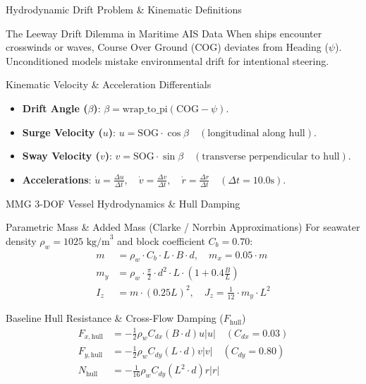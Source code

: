 \documentclass[t]{beamer}
\begin{document}
\begin{frame}{Hydrodynamic Drift Problem \& Kinematic Definitions}
    \begin{block}{The Leeway Drift Dilemma in Maritime AIS Data}
        When ships encounter crosswinds or waves, Course Over Ground ($\mathrm{COG}$) deviates from Heading ($\psi$). Unconditioned models mistake environmental drift for intentional steering.
    \end{block}

    \begin{block}{Kinematic Velocity \& Acceleration Differentials}
        \begin{itemize}
            \item \textbf{Drift Angle ($\beta$)}: $\beta = \mathrm{wrap\_to\_pi}(\mathrm{COG} - \psi)$.
            \item \textbf{Surge Velocity ($u$)}: $u = \mathrm{SOG} \cdot \cos\beta \quad (\text{longitudinal along hull})$.
            \item \textbf{Sway Velocity ($v$)}: $v = \mathrm{SOG} \cdot \sin\beta \quad (\text{transverse perpendicular to hull})$.
            \item \textbf{Accelerations}: $\dot{u} = \frac{\Delta u}{\Delta t}, \quad \dot{v} = \frac{\Delta v}{\Delta t}, \quad \dot{r} = \frac{\Delta r}{\Delta t} \quad (\Delta t = 10.0\text{s})$.
        \end{itemize}
    \end{block}
\end{frame}

\begin{frame}{MMG 3-DOF Vessel Hydrodynamics \& Hull Damping}
    \begin{block}{Parametric Mass \& Added Mass (Clarke / Norrbin Approximations)}
        For seawater density $\rho_w = 1025\text{ kg/m}^3$ and block coefficient $C_b = 0.70$:
        $$\begin{aligned}
        m &= \rho_w \cdot C_b \cdot L \cdot B \cdot d, \quad m_x = 0.05 \cdot m \\
        m_y &= \rho_w \cdot \frac{\pi}{2} \cdot d^2 \cdot L \cdot \left(1 + 0.4 \frac{B}{L}\right) \\
        I_z &= m \cdot (0.25 L)^2, \quad J_z = \frac{1}{12} \cdot m_y \cdot L^2
        \end{aligned}$$
    \end{block}

    \begin{block}{Baseline Hull Resistance \& Cross-Flow Damping ($F_{\mathrm{hull}}$)}
        $$\begin{aligned}
        F_{x,\mathrm{hull}} &= -\frac{1}{2} \rho_w C_{dx} (B \cdot d) u |u| \quad (C_{dx} = 0.03) \\
        F_{y,\mathrm{hull}} &= -\frac{1}{2} \rho_w C_{dy} (L \cdot d) v |v| \quad (C_{dy} = 0.80) \\
        N_{\mathrm{hull}} &= -\frac{1}{16} \rho_w C_{dy} (L^2 \cdot d) r |r|
        \end{aligned}$$
    \end{block}
\end{frame}
\end{document}
